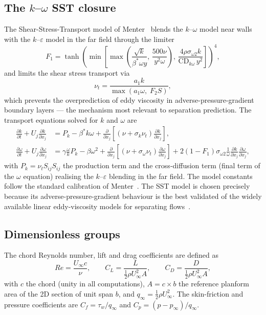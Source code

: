 \documentclass[11pt,a4paper]{article}
\begin{document}
\subsection{The $k$--$\omega$ SST closure}
The Shear-Stress-Transport model of Menter~\cite{menter1994} blends the $k$--$\omega$ model near walls with the $k$--$\varepsilon$ model in the far field through the limiter
\begin{equation}
  F_1 = \tanh\!\left(\min\!\left[\max\!\left(\frac{\sqrt{k}}{\beta^*\omega y},\,\frac{500\nu}{y^2\omega}\right),\,\frac{4\rho\sigma_{\omega2} k}{\mathrm{CD}_{k\omega}\, y^2}\right]\right)^4,
\end{equation}
and limits the shear stress transport via
\begin{equation}
  \nu_t = \frac{a_1 k}{\max\!\left(a_1\omega,\; F_2 S\right)},
\end{equation}
which prevents the overprediction of eddy viscosity in adverse-pressure-gradient boundary layers --- the mechanism most relevant to separation prediction. The transport equations solved for $k$ and $\omega$ are
\begin{align}
  \frac{\partial k}{\partial t} + U_j\frac{\partial k}{\partial x_j}
    &= P_k - \beta^* k \omega
       + \frac{\partial}{\partial x_j}\left[(\nu + \sigma_k \nu_t)\frac{\partial k}{\partial x_j}\right], \\
  \frac{\partial \omega}{\partial t} + U_j\frac{\partial \omega}{\partial x_j}
    &= \gamma \frac{\omega}{k} P_k - \beta \omega^2
       + \frac{\partial}{\partial x_j}\left[(\nu + \sigma_\omega \nu_t)\frac{\partial \omega}{\partial x_j}\right]
       + 2(1 - F_1)\sigma_{\omega 2}\frac{1}{\omega}\frac{\partial k}{\partial x_j}\frac{\partial \omega}{\partial x_j},
\end{align}
with $P_k = \nu_t S_{ij} S_{ij}$ the production term and the cross-diffusion term (final term of the $\omega$ equation) realising the $k$--$\varepsilon$ blending in the far field. The model constants follow the standard calibration of Menter~\cite{menter1994}. The SST model is chosen precisely because its adverse-pressure-gradient behaviour is the best validated of the widely available linear eddy-viscosity models for separating flows~\cite{menter2003}.

\subsection{Dimensionless groups}
The chord Reynolds number, lift and drag coefficients are defined as
\begin{equation}
  Re = \frac{U_\infty c}{\nu}, \qquad
  C_L = \frac{L}{\tfrac12 \rho U_\infty^2 A}, \qquad
  C_D = \frac{D}{\tfrac12 \rho U_\infty^2 A},
\end{equation}
with $c$ the chord (unity in all computations), $A = c \times b$ the reference planform area of the 2D section of unit span $b$, and $q_\infty = \tfrac12\rho U_\infty^2$. The skin-friction and pressure coefficients are $C_f = \tau_w/q_\infty$ and $C_p = (p - p_\infty)/q_\infty$.
\end{document}
